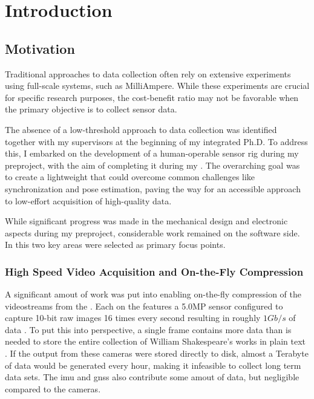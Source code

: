 \chapter{Introduction}

\section{Motivation}
Traditional approaches to data collection often rely on extensive experiments using full-scale systems, such as MilliAmpere.
While these experiments are crucial for specific research purposes, the cost-benefit ratio may not be favorable when the primary objective is to collect sensor data.

The absence of a low-threshold approach to data collection was identified together with my supervisors at the beginning of my integrated Ph.D.
To address this, I embarked on the development of a human-operable sensor rig during my preproject, with the aim of completing it during my \master.
The overarching goal was to create a lightweight \sr that could overcome common challenges like synchronization and pose estimation, paving the way for an accessible approach to low-effort acquisition of high-quality data.


While significant progress was made in the mechanical design and electronic aspects during my preproject, considerable work remained on the software side.
In this \master two key areas were selected as primary focus points.

\subsection{High Speed Video Acquisition and On-the-Fly Compression}
A significant amout of work was put into enabling on-the-fly compression of the videostreams from the \sr.
Each \cam on the \sr features a 5.0MP sensor configured to capture 10-bit raw images 16 times every second resulting in roughly $1Gb/s$ of data \cite{lucidvisionlabsTriton0MPPolarization}.
To put this into perspective, a single frame contains more data than is needed to store the entire collection of William Shakespeare's works in plain text \cite{projectgutenbergCompleteWorksWilliam1994}.
If the output from these cameras were stored directly to disk, almost a Terabyte of data would be generated every hour, making it infeasible to collect long term data sets.
The \gls{imu} and \gls{gnss} also contribute some amout of data, but negligible compared to the cameras.

